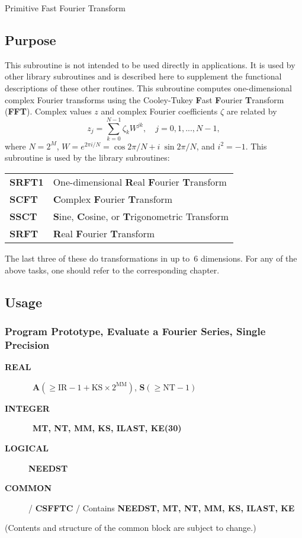 \documentclass[twoside]{MATH77}
\begin{document}
 Primitive Fast Fourier Transform


\subsection{Purpose}

This subroutine is not intended to be used directly in applications. It is
used by other library subroutines and is described here to supplement the
functional descriptions of these other routines. This subroutine computes
one-dimensional complex Fourier transforms using the Cooley-Tukey {\bf F}ast
{\bf F}ourier {\bf T}ransform ({\bf FFT}). Complex values $z$ and complex
Fourier coefficients $\zeta $ are related by
\begin{equation}
\label{def}z_j=\sum_{k=0}^{N-1}\zeta _kW^{jk},\quad j=0,1,...,N-1,
\end{equation}
where $N =2^M$, $W=e^{2\pi i/N}=\cos 2\pi /N+i\ \sin 2\pi /N$,
and $i^2=-1$. This subroutine is used by the library subroutines:

\begin{tabular}{ll}
   {\bf SRFT1} & One-dimensional {\bf R}eal {\bf F}ourier {\bf T}ransform  \\
  {\bf SCFT} & {\bf C}omplex {\bf F}ourier {\bf T}ransform \\
  {\bf SSCT} & {\bf S}ine, {\bf C}osine, or {\bf T}rigonometric Transform \\
  {\bf SRFT}  & {\bf R}eal {\bf F}ourier {\bf T}ransform \\
\end{tabular}

The last three of these do transformations in up to~6 dimensions. For any of
the above tasks, one should refer to the corresponding chapter.

\subsection{Usage}

\subsubsection{Program Prototype, Evaluate a Fourier Series, Single Precision}

\begin{description}
\item[\bf REAL]  \ {\bf A}$(\geq \text{IR}-1+\text{KS}\times
2^{\text{MM}})$, {\bf S}$(\geq \text{NT}-1)$

\item[\bf INTEGER]  \ {\bf MT, NT, MM, KS, ILAST, KE(30)}

\item[\bf LOGICAL]  {\bf NEEDST}

\item[\bf COMMON]  / {\bf CSFFTC} / Contains {\bf NEEDST, MT, NT, MM, KS,
ILAST, KE}
\end{description}
(Contents and structure of the common block are subject to change.)
\end{document}
